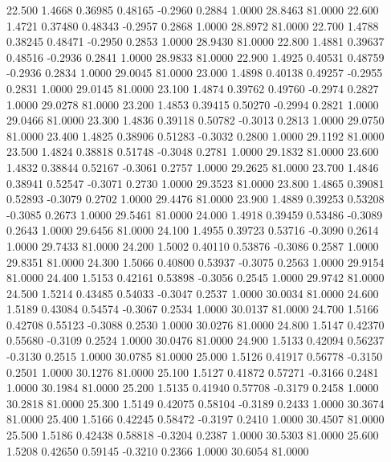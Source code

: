   22.500   1.4668   0.36985   0.48165  -0.2960   0.2884   1.0000  28.8463  81.0000
  22.600   1.4721   0.37480   0.48343  -0.2957   0.2868   1.0000  28.8972  81.0000
  22.700   1.4788   0.38245   0.48471  -0.2950   0.2853   1.0000  28.9430  81.0000
  22.800   1.4881   0.39637   0.48516  -0.2936   0.2841   1.0000  28.9833  81.0000
  22.900   1.4925   0.40531   0.48759  -0.2936   0.2834   1.0000  29.0045  81.0000
  23.000   1.4898   0.40138   0.49257  -0.2955   0.2831   1.0000  29.0145  81.0000
  23.100   1.4874   0.39762   0.49760  -0.2974   0.2827   1.0000  29.0278  81.0000
  23.200   1.4853   0.39415   0.50270  -0.2994   0.2821   1.0000  29.0466  81.0000
  23.300   1.4836   0.39118   0.50782  -0.3013   0.2813   1.0000  29.0750  81.0000
  23.400   1.4825   0.38906   0.51283  -0.3032   0.2800   1.0000  29.1192  81.0000
  23.500   1.4824   0.38818   0.51748  -0.3048   0.2781   1.0000  29.1832  81.0000
  23.600   1.4832   0.38844   0.52167  -0.3061   0.2757   1.0000  29.2625  81.0000
  23.700   1.4846   0.38941   0.52547  -0.3071   0.2730   1.0000  29.3523  81.0000
  23.800   1.4865   0.39081   0.52893  -0.3079   0.2702   1.0000  29.4476  81.0000
  23.900   1.4889   0.39253   0.53208  -0.3085   0.2673   1.0000  29.5461  81.0000
  24.000   1.4918   0.39459   0.53486  -0.3089   0.2643   1.0000  29.6456  81.0000
  24.100   1.4955   0.39723   0.53716  -0.3090   0.2614   1.0000  29.7433  81.0000
  24.200   1.5002   0.40110   0.53876  -0.3086   0.2587   1.0000  29.8351  81.0000
  24.300   1.5066   0.40800   0.53937  -0.3075   0.2563   1.0000  29.9154  81.0000
  24.400   1.5153   0.42161   0.53898  -0.3056   0.2545   1.0000  29.9742  81.0000
  24.500   1.5214   0.43485   0.54033  -0.3047   0.2537   1.0000  30.0034  81.0000
  24.600   1.5189   0.43084   0.54574  -0.3067   0.2534   1.0000  30.0137  81.0000
  24.700   1.5166   0.42708   0.55123  -0.3088   0.2530   1.0000  30.0276  81.0000
  24.800   1.5147   0.42370   0.55680  -0.3109   0.2524   1.0000  30.0476  81.0000
  24.900   1.5133   0.42094   0.56237  -0.3130   0.2515   1.0000  30.0785  81.0000
  25.000   1.5126   0.41917   0.56778  -0.3150   0.2501   1.0000  30.1276  81.0000
  25.100   1.5127   0.41872   0.57271  -0.3166   0.2481   1.0000  30.1984  81.0000
  25.200   1.5135   0.41940   0.57708  -0.3179   0.2458   1.0000  30.2818  81.0000
  25.300   1.5149   0.42075   0.58104  -0.3189   0.2433   1.0000  30.3674  81.0000
  25.400   1.5166   0.42245   0.58472  -0.3197   0.2410   1.0000  30.4507  81.0000
  25.500   1.5186   0.42438   0.58818  -0.3204   0.2387   1.0000  30.5303  81.0000
  25.600   1.5208   0.42650   0.59145  -0.3210   0.2366   1.0000  30.6054  81.0000
